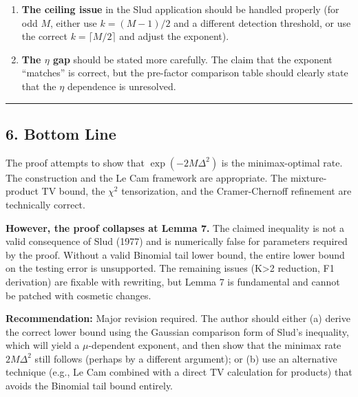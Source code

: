 \documentclass[
  12pt,
]{ctexart}
\begin{document}
\begin{enumerate}
\def\labelenumi{\arabic{enumi}.}
\setcounter{enumi}{3}
\item
  \textbf{The ceiling issue} in the Slud application should be handled
  properly (for odd \(M\), either use \(k = (M-1)/2\) and a different
  detection threshold, or use the correct \(k = \lceil M/2\rceil\) and
  adjust the exponent).
\item
  \textbf{The \(\eta\) gap} should be stated more carefully. The claim
  that the exponent ``matches'' is correct, but the pre-factor
  comparison table should clearly state that the \(\eta\) dependence is
  unresolved.
\end{enumerate}

\begin{center}\rule{0.5\linewidth}{0.5pt}\end{center}

\subsection{6. Bottom Line}\label{bottom-line}

The proof attempts to show that \(\exp(-2M\Delta^2)\) is the
minimax-optimal rate. The construction and the Le Cam framework are
appropriate. The mixture-product TV bound, the \(\chi^2\) tensorization,
and the Cramer-Chernoff refinement are technically correct.

\textbf{However, the proof collapses at Lemma 7.} The claimed inequality
is not a valid consequence of Slud (1977) and is numerically false for
parameters required by the proof. Without a valid Binomial tail lower
bound, the entire lower bound on the testing error is unsupported. The
remaining issues (K\textgreater2 reduction, F1 derivation) are fixable
with rewriting, but Lemma 7 is fundamental and cannot be patched with
cosmetic changes.

\textbf{Recommendation:} Major revision required. The author should
either (a) derive the correct lower bound using the Gaussian comparison
form of Slud's inequality, which will yield a \(\mu\)-dependent
exponent, and then show that the minimax rate \(2M\Delta^2\) still
follows (perhaps by a different argument); or (b) use an alternative
technique (e.g., Le Cam combined with a direct TV calculation for
products) that avoids the Binomial tail bound entirely.
\end{document}
